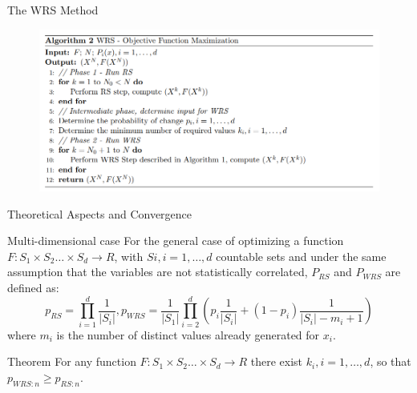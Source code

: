 \documentclass{beamer}
\begin{document}
\begin{frame}{The WRS Method}
\centering
\begin{figure}
        \centering
        \includegraphics[scale=0.7]{images/wrs2.png}
        \label{fig:enter-label}
    \end{figure} 
\end{frame}

\begin{frame}{Theoretical Aspects and Convergence}
\begin{block}{Multi-dimensional case}
    For the general case of optimizing a function $F : S_1 \times S_2 \dots \times S_d \to R$, with $Si, i = 1, \dots , d$ countable sets and under the same assumption that the variables are not statistically correlated, $P_{RS}$ and $P_{WRS}$ are defined as:
    \[p_{RS} = \prod_{i=1}^d \frac{1}{|S_i|}, p_{WRS} = \frac{1}{|S_1|} \prod_{i=2}^d \left(p_i \frac{1}{|S_i|} + (1 − p_i) \frac{1}{|S_i| - m_i + 1} \right)\]
    where $m_i$ is the number of distinct values already generated for $x_i$.
\end{block}
\begin{block}{Theorem}
    For any function $F : S_1 \times S_2 \dots \times S_d \to R$ there exist $k_i, i = 1, \dots , d$, so that $p_{WRS:n} \geq p_{RS:n}$.
\end{block}
\end{frame}
\end{document}
